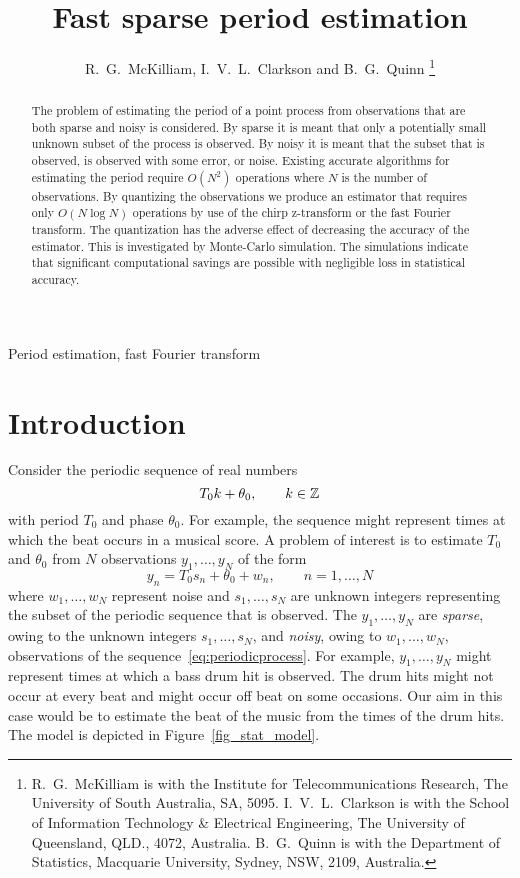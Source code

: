 \documentclass[10pt,twocolumn,twoside]{IEEEtran}
\title{Fast sparse period estimation}
\author{R.~G.~McKilliam, I.~V.~L.~Clarkson and B.~G.~Quinn    
\thanks{
R.~G.~McKilliam is with the Institute for Telecommunications Research, The University of South Australia, SA, 5095.  I.~V.~L.~Clarkson is with the School of Information Technology \& Electrical Engineering, The University of Queensland, QLD., 4072, Australia.  B.~G.~Quinn is with the Department of Statistics, Macquarie University, Sydney, NSW, 2109, Australia.
}}
\begin{document}
\maketitle

\begin{abstract}

The problem of estimating the period of a point process from observations that are both sparse and noisy is considered.  By sparse it is meant that only a potentially small unknown subset of the process is observed.  By noisy it is meant that the subset that is observed, is observed with some error, or noise.  Existing accurate algorithms for estimating the period require $O(N^2)$ operations where $N$ is the number of observations.  By quantizing the observations we produce an estimator that requires only $O(N\log N)$ operations by use of the chirp z-transform or the fast Fourier transform.  The quantization has the adverse effect of decreasing the accuracy of the estimator.  This is investigated by Monte-Carlo simulation.  The simulations indicate that significant computational savings are possible with negligible loss in statistical accuracy.

\end{abstract} 
\begin{IEEEkeywords}
Period estimation, fast Fourier transform
\end{IEEEkeywords}

\section{Introduction}

Consider the periodic sequence of real numbers
\begin{equation}\label{eq:periodicprocess}
T_0 k + \theta_0, \qquad k \in {\mathbb Z}
\end{equation}
with period $T_0$ and phase $\theta_0$.  For example, the sequence might represent times at which the beat occurs in a musical score.  A problem of interest is to estimate $T_0$ and $\theta_0$ from $N$ observations $y_1,\dots,y_N$ of the form
\begin{equation} \label{eq:sigmodel}
y_n = T_0 s_n + \theta_0 + w_n, \qquad n = 1,\dots,N
\end{equation}
where $w_1,\dots,w_N$ represent noise and $s_1,\dots,s_N$ are unknown integers representing the subset of the periodic sequence that is observed.  The $y_1, \dots, y_N$ are \emph{sparse}, owing to the unknown integers $s_1,\dots,s_N$, and \emph{noisy}, owing to $w_1,\dots,w_N$, observations of the sequence~\eqref{eq:periodicprocess}.  For example, $y_1,\dots,y_N$ might represent times at which a bass drum hit is observed.  The drum hits might not occur at every beat and might occur off beat on some occasions.  Our aim in this case would be to estimate the beat of the music from the times of the drum hits.  The model is depicted in Figure~\ref{fig_stat_model}. %
\end{document}
